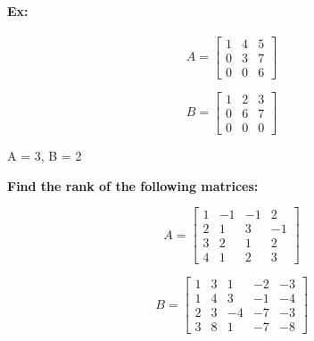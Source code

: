 \documentclass{article}
\begin{document}
    \paragraph{Ex:}
    \begin{minipage}{0.45\textwidth}
    \[ A = \begin{bmatrix} 1 & 4 & 5 \\ 0 & 3 & 7 \\ 0 & 0 & 6 \end{bmatrix} \]
    \end{minipage}
    \begin{minipage}{0.45\textwidth}
        \[ B = \begin{bmatrix} 1 & 2 & 3 \\ 0 & 6 & 7 \\ 0 & 0 & 0 \end{bmatrix} \]
    \end{minipage}

    \vspace{20pt}
     A = 3, \quad {} B = 2

    \vspace{60pt}
    \textbf{Find the rank of the following matrices:}
    
    \begin{center}
    \begin{minipage}{0.45\textwidth}
    \[ A = \begin{bmatrix} 1 & -1 & -1 & 2 \\ 2 & 1 & 3 & -1 \\ 3 & 2 & 1 & 2 \\ 4 & 1 & 2 & 3 \end{bmatrix} \]
    \end{minipage}
    \hspace{0.05\textwidth}
    \begin{minipage}{0.45\textwidth}
    \[ B = \begin{bmatrix} 1 & 3 & 1 & -2 & -3 \\ 1 & 4 & 3 & -1 & -4 \\ 2 & 3 & -4 & -7 & -3 \\ 3 & 8 & 1 & -7 & -8 \end{bmatrix} \]
    \end{minipage}
    \end{center}
    
    \vspace{1em}
    
\end{document}
